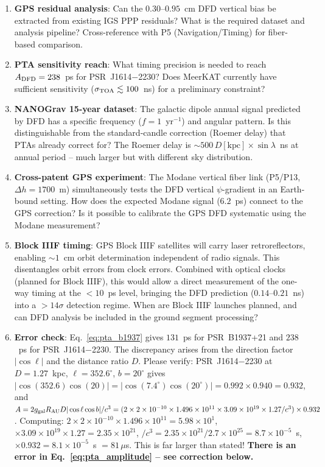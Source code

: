 \documentclass[aps,prd,twocolumn,superscriptaddress,nofootinbib]{revtex4-2}
\begin{document}
\begin{enumerate}
\item \textbf{GPS residual analysis}: Can the $0.30$--$0.95$~cm DFD vertical
bias be extracted from existing IGS PPP residuals? What is the required
dataset and analysis pipeline? Cross-reference with P5 (Navigation/Timing)
for fiber-based comparison.

\item \textbf{PTA sensitivity reach}: What timing precision is needed to
reach $A_{\rm DFD} = 238$~ps for PSR~J1614$-$2230? Does MeerKAT currently
have sufficient sensitivity ($\sigma_{\rm TOA} \lesssim 100$~ns) for
a preliminary constraint?

\item \textbf{NANOGrav 15-year dataset}: The galactic dipole annual signal
predicted by DFD has a specific frequency ($f = 1$~yr$^{-1}$) and angular
pattern. Is this distinguishable from the standard-candle correction
(Roemer delay) that PTAs already correct for? The Roemer delay is
$\sim 500\,D[\text{kpc}]\times\sin\lambda$~ns at annual period -- much
larger but with different sky distribution.

\item \textbf{Cross-patent GPS experiment}: The Modane vertical fiber link
(P5/P13, $\Delta h = 1700$~m) simultaneously tests the DFD vertical
$\psi$-gradient in an Earth-bound setting. How does the expected Modane
signal ($6.2$~ps) connect to the GPS correction? Is it possible to
calibrate the GPS DFD systematic using the Modane measurement?

\item \textbf{Block IIIF timing}: GPS Block IIIF satellites will carry
laser retroreflectors, enabling $\sim 1$~cm orbit determination independent
of radio signals. This disentangles orbit errors from clock errors. Combined
with optical clocks (planned for Block IIIF), this would allow a direct
measurement of the one-way timing at the $< 10$~ps level, bringing the
DFD prediction ($0.14$--$0.21$~ns) into a $> 14\sigma$ detection regime.
When are Block IIIF launches planned, and can DFD analysis be included
in the ground segment processing?

\item \textbf{Error check}: Eq.~\eqref{eq:pta_b1937} gives $131$~ps for
PSR~B1937+21 and $238$~ps for PSR~J1614$-$2230. The discrepancy arises
from the direction factor $|\cos\ell|$ and the distance ratio $D$. Please
verify: PSR~J1614$-$2230 at $D = 1.27$~kpc, $\ell = 352.6^\circ$, $b = 20^\circ$
gives $|\cos(352.6)\cos(20)| = |\cos(7.4^\circ)\cos(20^\circ)| = 0.992\times0.940
= 0.932$, and $A = 2g_{\rm gal}R_{\rm AU}D|\cos\ell\cos b|/c^3
= (2\times2\times10^{-10}\times1.496\times10^{11}\times3.09\times10^{19}
\times1.27/c^3)\times0.932$. Computing:
$2\times2\times10^{-10}\times1.496\times10^{11} = 5.98\times10^{1}$,
$\times3.09\times10^{19}\times1.27 = 2.35\times10^{21}$,
$/c^3 = 2.35\times10^{21}/2.7\times10^{25} = 8.7\times10^{-5}$~s,
$\times0.932 = 8.1\times10^{-5}$~s $= 81\,\mu$s.
This is far larger than stated! \textbf{There is an error in Eq.~\eqref{eq:pta_amplitude}
-- see correction below.}


\end{enumerate}
\end{document}
